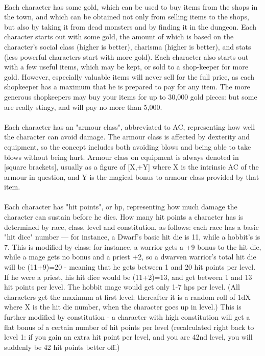 \paragraph{}
Each character has some gold, which can be used to buy items from the
shops in the town, and which can be obtained not only from selling items
to the shops, but also by taking it from dead monsters and by finding it
in the dungeon. Each character starts out with some gold, the amount of
which is based on the character's social class (higher is better),
charisma (higher is better), and stats (less powerful characters start
with more gold). Each character also starts out with a few useful
items, which may be kept, or sold to a shop-keeper for more gold.
However, especially valuable items will never sell for the full price,
as each shopkeeper has a maximum that he is prepared to pay for any
item. The more generous shopkeepers may buy your items for up to 30,000
gold pieces: but some are really stingy, and will pay no more than
5,000.

\paragraph{}
Each character has an "armour class", abbreviated to AC, representing
how well the character can avoid damage. The armour class is affected
by dexterity and equipment, so the concept includes both avoiding blows
and being able to take blows without being hurt. Armour class on
equipment is always denoted in [square brackets], usually as a figure of
[X,+Y] where X is the intrinsic AC of the armour in question, and Y is
the magical bonus to armour class provided by that item.

\paragraph{}
Each character has "hit points", or hp, representing how much damage the
character can sustain before he dies. How many hit points a character
has is determined by race, class, level and constitution, as follows:
each race has a basic "hit dice" number --- for instance, a Dwarf's basic
hit die is 11, while a hobbit's is 7. This is modified by class: for
instance, a warrior gets a +9 bonus to the hit die, while a mage gets no
bonus and a priest +2, so a dwarven warrior's total hit die will be
(11+9)=20 - meaning that he gets between 1 and 20 hit points per level.
If he were a priest, his hit dice would be (11+2)=13, and get between 1
and 13 hit points per level. The hobbit mage would get only 1-7 hps per
level. (All characters get the maximum at first level: thereafter it is
a random roll of 1dX where X is the hit die number, when the character
goes up in level.) This is further modified by constitution - a
character with high constitution will get a flat bonus of a certain
number of hit points per level (recalculated right back to level 1: if
you gain an extra hit point per level, and you are 42nd level, you will
suddenly be 42 hit points better off.)

